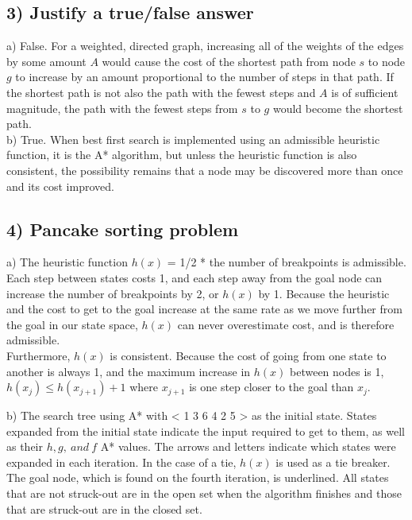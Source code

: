 \documentclass{article}
\begin{document}
\subsection*{3) Justify a true/false answer}

a) False. For a weighted, directed graph, increasing all of the weights of the edges by some amount $A$ would cause the cost of the shortest path from node $s$ to node $g$ to increase by an amount proportional to the number of steps in that path. If the shortest path is not also the path with the fewest steps and $A$ is of sufficient magnitude, the path with the fewest steps from $s$ to $g$ would become the shortest path.\\

b) True. When best first search is implemented using an admissible heuristic function, it is the A* algorithm, but unless the heuristic function is also consistent, the possibility remains that a node may be discovered more than once and its cost improved.


\subsection*{4) Pancake sorting problem}

a) The heuristic function $h(x)$ = 1/2 * the number of breakpoints is admissible. Each step between states costs 1, and each step away from the goal node can increase the number of breakpoints by 2, or $h(x)$ by 1. Because the heuristic and the cost to get to the goal increase at the same rate as we move further from the goal in our state space, $h(x)$ can never overestimate cost, and is therefore admissible.\\

Furthermore, $h(x)$ is consistent. Because the cost of going from one state to another is always 1, and the maximum increase in $h(x)$ between nodes is 1, $h(x_{j}) \leq h(x_{j + 1}) + 1$ where $x_{j + 1}$ is one step closer to the goal than $x_{j}$.

b) The search tree using A* with < 1 3 6 4 2 5 > as the initial state. States expanded from the initial state indicate the input required to get to them, as well as their $h, g,\ and\ f$ A* values. The arrows and letters indicate which states were expanded in each iteration. In the case of a tie, $h(x)$ is used as a tie breaker. The goal node, which is found on the fourth iteration, is underlined. All states that are not struck-out are in the open set when the algorithm finishes and those that are struck-out are in the closed set.\\
\end{document}
